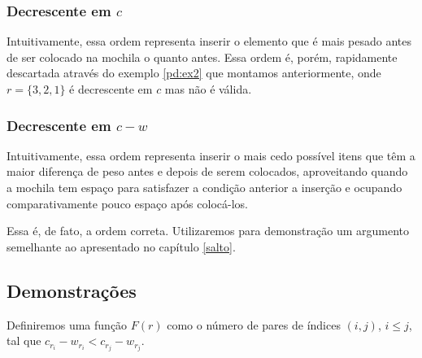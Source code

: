 \subsubsection*{Decrescente em $c$}

Intuitivamente, essa ordem representa inserir o elemento que é mais pesado antes de ser colocado na mochila o quanto antes. Essa ordem é, porém, rapidamente descartada através do exemplo \ref{pd:ex2} que montamos anteriormente, onde $r = \{3, 2, 1\}$ é decrescente em $c$ mas não é válida.

\subsubsection*{Decrescente em $c - w$}

Intuitivamente, essa ordem representa inserir o mais cedo possível itens que têm a maior diferença de peso antes e depois de serem colocados, aproveitando quando a mochila tem espaço para satisfazer a condição anterior a inserção e ocupando comparativamente pouco espaço após colocá-los.

Essa é, de fato, a ordem correta. Utilizaremos para demonstração um argumento semelhante ao apresentado no capítulo \ref{salto}.

\subsection*{Demonstrações}

Definiremos uma função $F(r)$ como o número de pares de índices $(i, j)$, $i \leq j$, tal que $c_{r_i} - w_{r_i} < c_{r_j} - w_{r_j}$.

